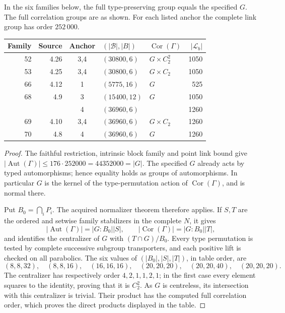 \documentclass[11pt]{article}
\newcommand{\Aut}{\operatorname{Aut}}\newcommand{\Cor}{\operatorname{Cor}}
\begin{document}
\begin{theorem}
In the six families below, the full type-preserving group equals the
specified $G$. The full correlation groups are as shown. For each listed
anchor the complete link group has order $252\,000$.
\end{theorem}
\begin{center}\small
\begin{tabular}{rrcllr}
\toprule
Family & Source & Anchor & $(|\mathcal B|,|B|)$ & $\Cor(\Gamma)$ & $|\mathcal L_b|$\\
\midrule
52 & 4.26 & 3,4 & $(30800,6)$ & $G\times C_2^2$ & 1050\\
53 & 4.25 & 3,4 & $(30800,6)$ & $G\times C_2$ & 1050\\
66 & 4.12 & 1 & $(5775,16)$ & $G$ & 525\\
68 & 4.9 & 3 & $(15400,12)$ & $G$ & 1050\\
   &     & 4 & $(36960,6)$ & & 1260\\
69 & 4.10 & 3,4 & $(36960,6)$ & $G\times C_2$ & 1260\\
70 & 4.8 & 4 & $(36960,6)$ & $G$ & 1260\\
\bottomrule
\end{tabular}\end{center}
\begin{proof}
The faithful restriction, intrinsic block family and point link bound give
$|\Aut(\Gamma)|\leq176\cdot252000=44352000=|G|$.
The specified $G$ already acts by typed automorphisms; hence equality
holds as groups of automorphisms. In particular $G$ is the kernel of
the type-permutation action of $\Cor(\Gamma)$, and is normal there.

Put $B_0=\bigcap_iP_i$. The acquired normalizer theorem therefore applies.
If $S,T$ are the ordered and setwise family stabilizers in the complete
$N$, it gives
\[
 |\Aut(\Gamma)|=|G:B_0||S|,\qquad
 |\Cor(\Gamma)|=|G:B_0||T|,
\]
and identifies the centralizer of $G$ with $(T\cap G)/B_0$.
Every type permutation is tested by complete successive subgroup
transporters, and each positive lift is checked on all parabolics.
The six values of $(|B_0|,|S|,|T|)$, in table order, are
\[
 (8,8,32),\quad(8,8,16),\quad(16,16,16),\quad
 (20,20,20),\quad(20,20,40),\quad(20,20,20).
\]
The centralizer has respectively order $4,2,1,1,2,1$; in the first case
every element squares to the identity, proving that it is $C_2^2$.
As $G$ is centreless, its intersection with this centralizer is trivial.
Their product has the computed full correlation order, which proves
the direct products displayed in the table.
\end{proof}
\end{document}
